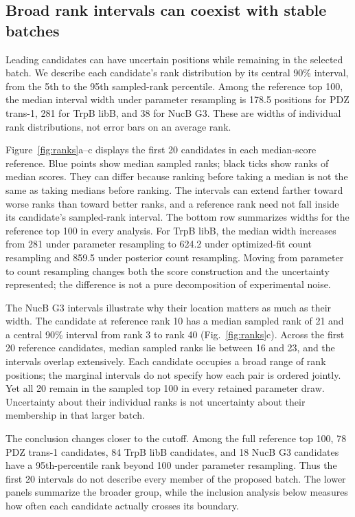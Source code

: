 \documentclass[11pt]{article}
\begin{document}
\subsection{Broad rank intervals can coexist with stable batches}
\label{sec:noise}
\label{sec:ranks}

Leading candidates can have uncertain positions while remaining in
the selected batch. We describe each candidate's rank distribution
by its central 90\% interval, from the 5th to the 95th sampled-rank
percentile. Among the reference top 100, the median interval width
under parameter resampling is 178.5 positions for PDZ trans-1, 281 for
TrpB libB, and 38 for NucB G3. These are widths of individual rank
distributions, not error bars on an average rank.

Figure~\ref{fig:ranks}a--c displays the first 20 candidates in each
median-score reference. Blue points show median sampled ranks;
black ticks show ranks of median scores. They can differ because
ranking before taking a median is not the same as taking medians
before ranking. The intervals can extend farther toward worse ranks
than toward better ranks, and a reference rank need not fall inside
its candidate's sampled-rank interval. The bottom row summarizes
widths for the reference top 100 in every analysis. For TrpB libB,
the median width increases from 281 under parameter resampling to
624.2 under optimized-fit count resampling and 859.5 under posterior
count resampling. Moving from parameter to count resampling changes
both the score construction and the uncertainty represented; the
difference is not a pure decomposition of experimental noise.

The NucB G3 intervals illustrate why their location matters as much as
their width. The candidate at reference rank 10 has a median sampled
rank of 21 and a central 90\% interval from rank 3 to rank 40
(Fig.~\ref{fig:ranks}c). Across the first 20 reference candidates,
median sampled ranks lie between 16 and 23, and the intervals overlap
extensively. Each candidate occupies a broad range of rank positions;
the marginal intervals do not specify how each pair is ordered jointly.
Yet all 20 remain in the sampled top 100
in every retained parameter draw. Uncertainty about their individual ranks is not
uncertainty about their membership in that larger batch.

The conclusion changes closer to the cutoff. Among the full reference
top 100, 78 PDZ trans-1 candidates, 84 TrpB libB candidates, and 18 NucB G3
candidates have a 95th-percentile rank beyond 100 under parameter
resampling. Thus the first 20 intervals do not describe every member
of the proposed batch. The lower panels summarize the broader group,
while the inclusion analysis below measures how often each candidate
actually crosses its boundary.
\end{document}
